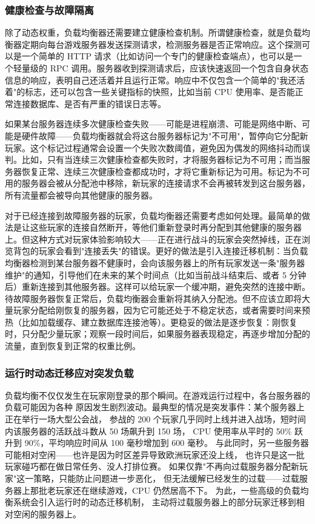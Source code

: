 \subsubsection{健康检查与故障隔离}

除了动态权重，负载均衡器还需要建立健康检查机制。所谓健康检查，就是负载均衡器定期向每台游戏服务器发送探测请求，检测服务器是否正常响应。这个探测可以是一个简单的 HTTP 请求（比如访问一个专门的健康检查端点），也可以是一个轻量级的 RPC 调用。服务器收到探测请求后，应该快速返回一个包含自身状态信息的响应，表明自己还活着并且运行正常。响应中不仅包含一个简单的"我还活着"的标志，还可以包含一些关键指标的快照，比如当前 CPU 使用率、是否能正常连接数据库、是否有严重的错误日志等。

如果某台服务器连续多次健康检查失败——可能是进程崩溃、可能是网络中断、可能是硬件故障——负载均衡器就会将这台服务器标记为"不可用"，暂停向它分配新玩家。这个标记过程通常会设置一个失败次数阈值，避免因为偶发的网络抖动而误判。比如，只有当连续三次健康检查都失败时，才将服务器标记为不可用；而当服务器恢复正常、连续三次健康检查都成功时，才将它重新标记为可用。标记为不可用的服务器会被从分配池中移除，新玩家的连接请求不会再被转发到这台服务器，所有流量都会被导向其他健康的服务器。

对于已经连接到故障服务器的玩家，负载均衡器还需要考虑如何处理。最简单的做法是让这些玩家的连接自然断开，等他们重新登录时再分配到其他健康的服务器上。但这种方式对玩家体验影响较大——正在进行战斗的玩家会突然掉线，正在浏览背包的玩家会看到"连接丢失"的错误。更好的做法是引入连接迁移机制：当负载均衡器检测到某台服务器不健康时，会向该服务器上的所有玩家发送一条"服务器维护"的通知，引导他们在未来的某个时间点（比如当前战斗结束后、或者 5 分钟后）重新连接到其他服务器。这样可以给玩家一个缓冲期，避免突然的连接中断。待故障服务器恢复正常后，负载均衡器会重新将其纳入分配池。但不应该立即将大量玩家分配给刚恢复的服务器，因为它可能还处于不稳定状态，或者需要时间来预热（比如加载缓存、建立数据库连接池等）。更稳妥的做法是逐步恢复：刚恢复时，只分配少量玩家；观察一段时间后，如果服务器表现稳定，再逐步增加分配的流量，直到恢复到正常的权重比例。

\subsubsection{运行时动态迁移应对突发负载}

负载均衡不仅仅发生在玩家刚登录的那个瞬间。在游戏运行过程中，各台服务器的负载可能因为各种
原因发生剧烈波动。最典型的情况是突发事件：某个服务器上正在举行一场大型公会战，
参战的 200 个玩家几乎同时上线并进入战场，短时间内该服务器的活跃战斗数从 50 场飙升到 150 场，
CPU 使用率从平时的 50\% 跃升到 90\%，平均响应时间从 100 毫秒增加到 600 毫秒。
与此同时，另一些服务器可能相对空闲——也许是因为时区差异导致欧洲玩家还没上线，
也许只是这一批玩家碰巧都在做日常任务、没人打排位赛。
如果仅靠"不再向过载服务器分配新玩家"这一策略，只能防止问题进一步恶化，
但无法缓解已经发生的过载——过载服务器上那批老玩家还在继续游戏，CPU 仍然居高不下。
为此，一些高级的负载均衡系统会引入运行时的动态迁移机制，
主动将过载服务器上的部分玩家迁移到相对空闲的服务器上。

